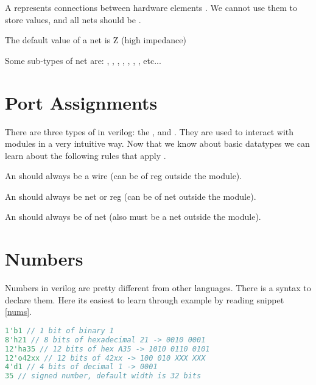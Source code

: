A  represents connections between hardware elements . We cannot use them to store values, and all nets should be .
\begin{bullets}
	\item The default value of a net is Z (high impedance)
	\item Some sub-types of net are: , , , , , , , etc...
\end{bullets}


\section{Port Assignments}

There are three types of  in verilog: the ,  and . They are used to interact with modules in a very intuitive way. Now that we know about basic datatypes we can learn about the following rules that apply .
\begin{bullets}
	\item An  should always be a wire (can be of reg outside the module).
	\item An  should always be net or reg (can be of net outside the module).
	\item An  should always be of net (also must be a net outside the module).
\end{bullets}

\section{Numbers}

Numbers in verilog are pretty different from other languages. There is a syntax to declare them. Here its easiest to learn through example by reading snippet \ref{nums}.
\begin{lstlisting}[language=Verilog, caption={Numbers in Verilog}, label=nums]
1'b1 // 1 bit of binary 1
8'h21 // 8 bits of hexadecimal 21 -> 0010 0001
12'ha35 // 12 bits of hex A35 -> 1010 0110 0101
12'o42xx // 12 bits of 42xx -> 100 010 XXX XXX
4'd1 // 4 bits of decimal 1 -> 0001
35 // signed number, default width is 32 bits
\end{lstlisting}

